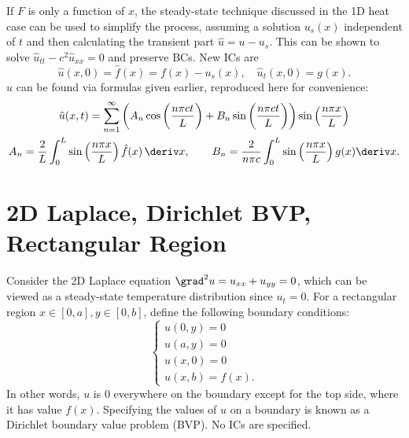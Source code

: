 \documentclass[10pt, a4paper]{article}
\begin{document}
\begin{landscape}
\begin{multicols*}{2}
    If \(F\) is only a function of \(x\), the steady-state technique discussed in the 1D heat case can be used
    to simplify the process, assuming a solution \(u_s(x)\) independent of \(t\) and then calculating the transient
    part \(\hat u = u - u_s\). This can be shown to solve \(\hat u_{tt} - c^2 \hat u_{xx} = 0\) and preserve BCs.
    New ICs are
    \[
        \hat u(x, 0) = \hat f(x) = f(x) - u_s(x),
        \quad
        \hat u_t(x, 0) = g(x).
    \]
    \(\hat u\) can be found via formulas given earlier, reproduced here for convenience:
    \begin{gather*}
        \hat u(x, t) = \sum_{n=1}^{\infty} \left(
            A_n \cos\left(\frac{n \pi c t}{L}\right) + B_n \sin\left(\frac{n \pi ct}{L}\right)
            \right) \sin \left(\frac{n \pi x}{L}\right) \\
        A_n = \frac{2}{L} \int_0^L \sin\left(\frac{n \pi x}{L}\right) \hat f(x) \,\deriv x,
        \qquad
        B_n = \frac{2}{n \pi c} \int_0^L \sin\left(\frac{n \pi x}{L}\right) g(x) \deriv x.
    \end{gather*}

    \section{2D Laplace, Dirichlet BVP, Rectangular Region}

    Consider the 2D Laplace equation \(\grad^2 u = u_{xx} + u_{yy} = 0\), which can be viewed as a steady-state
    temperature distribution since \(u_{t} = 0\). For a rectangular region \(x \in [0, a], y \in [0, b]\),
    define the following boundary conditions:
    \[
        \begin{cases}
            u(0, y) = 0 \\
            u(a, y) = 0 \\
            u(x, 0) = 0 \\
            u(x, b) = f(x).
        \end{cases}
    \]
    In other words, \(u\) is 0 everywhere on the boundary except for the top side, where it has value \(f(x)\).
    Specifying the values of \(u\) on a boundary is known as a Dirichlet boundary value problem (BVP).
    No ICs are specified.
    

\end{multicols*}
\end{landscape}
\end{document}
